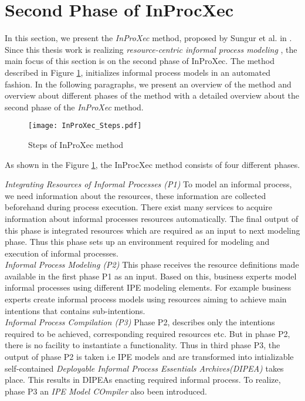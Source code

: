 \section{Second Phase of InProcXec}
\label{sec:inproxec}
In this section, we present the \textit{InProXec} method, proposed by Sungur et al. in \cite{Sungur2015}. Since this thesis work is realizing \textit{resource-centric informal process modeling} , the main focus of this section is on the second phase of InProXec. The method described in Figure \ref{fig:inprocxec_steps}, initializes informal process models in an automated fashion. In the following paragraphs, we present an overview of the method and overview about different phases of the method with a detailed overview about the second phase of the \textit{InProXec} method. 

\begin{figure}
	\centering
	\texttt{[image: InProXec\_Steps.pdf]}
	\caption{Steps of InProXec method \cite{Sungur2015}}
	\label{fig:inprocxec_steps}
\end{figure} 

As shown in the Figure \ref{fig:inprocxec_steps}, the InProcXec method consists of four different phases.

\textit{Integrating Resources of Informal Processes (P1)} To model an informal process, we need information about the resources, these information are collected beforehand during process execution. There exist many services to acquire information about informal processes resources automatically. The final output of this phase is integrated resources which are required as an input to next modeling phase. Thus this phase sets up an environment required for modeling and execution of informal processes.  \\

\textit{Informal Process Modeling (P2)}  This phase receives the resource definitions made available in the first phase P1 as an input.  Based on this, business experts model informal processes using different IPE modeling elements. For example business experts create informal process models using resources aiming to achieve main intentions that contains sub-intentions.   \\

\textit{Informal Process Compilation (P3)}  Phase P2, describes only the intentions required to be achieved, corresponding required resources etc. But in phase P2, there is no facility to instantiate a functionality. Thus in third phase P3, the output of phase P2 is taken i.e IPE models and are transformed into intializable self-contained \textit{Deployable Informal Process Essentials Archives(DIPEA)} \cite{Sungur2015} takes place. This results in DIPEAs enacting required informal process. To realize, phase P3 an \textit{IPE Model COmpiler} also been introduced. \\

